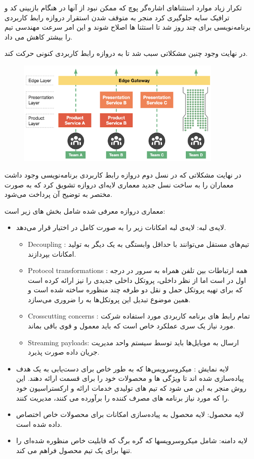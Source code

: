 تکرار زیاد موارد استثناهای اشاره‌گر پوچ  که ممکن نبود از آنها در هنگام بازبینی کد و ترافیک سایه جلوگیری کرد منجر به متوقف شدن استقرار دروازه رابط کاربردی برنامه‌نویسی برای چند روز شد تا استثنا ها اصلاح شوند و این امر سرعت مهندسی تیم  را بیشتر کاهش می داد.

در نهایت وجود چنین مشکلاتی سبب شد تا  به دروازه رابط کاربردی کنونی حرکت کند.
\begin{figure}[h]
\label{fig:apigateway_gen3}
\centering
\includegraphics[width=10cm]{gen3_apigateway.png}
\end{figure}
در نهایت مشکلاتی که در نسل دوم دروازه رابط کاربردی برنامه‌نویسی وجود داشت معماران را به ساخت نسل جدید معماری لایه‌ای دروازه تشویق کرد که به صورت مختصر به توضیح آن پرداخت می‌شود.

معماری دروازه معرفی شده شامل بخش های زیر است:
\begin{itemize}
\item
لایه‌ی لبه: لایه‌ی لبه امکانات زیر را به صورت کامل در اختیار قرار می‌دهد.
\begin{itemize}
\item
Decoupling :
تیم‌های مستقل می‌توانند با حداقل وابستگی به یک دیگر به تولید امکانات بپردازند.
\item
Protocol transformations :
همه ارتباطات بین تلفن همراه به سرور در درجه اول در  است اما از نظر داخلی،  پروتکل داخلی جدیدی را نیز ارائه کرده است که برای تهیه پروتکل حمل و نقل دو طرفه چند منظوره ساخته شده است و همین موضوع تبدیل این پروتکل‌ها به  را ضروری می‌سازد.
\item
Crosscutting concerns :
تمام رابط های برنامه کاربردی مورد استفاده شرکت مورد نیاز یک سری عملکرد خاص است که باید معمول و قوی باقی بماند.
\item
Streaming payloads:
ارسال  به موبایل‌ها باید توسط سیستم واحد مدیریت جریان داده صورت پذیرد.
\end{itemize}
\item
لایه نمایش :
میکروسرویس‌ها که به طور خاص برای دست‌یابی به یک هدف پیاده‌سازی شده اند تا ویژگی ها و محصولات خود را برای قسمت  ارائه دهند. این روش منجر به این می شود که تیم های تولیدی خدمات ارائه و ارکستراسیون خود را که  مورد نیاز برنامه های مصرف کننده را برآورده می کنند، مدیریت کنند.
\item
لایه محصول:
لایه محصول به پیاده‌سازی امکانات برای محصولات خاص اختصاص داده شده است.
\item
لایه دامنه:
شامل میکروسرویسها که گره برگ که قابلیت خاص منظوره شده‌ای را تنها برای یک تیم محصول فراهم می کند.
\end{itemize}